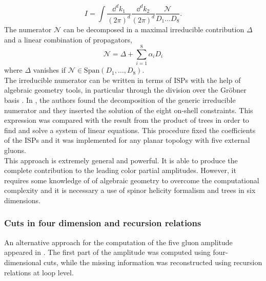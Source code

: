 $$
	I=\int \frac{\dd^d k_1}{(2\pi)^d} \frac{\dd^d k_2}{(2\pi)^d} \frac{\mathcal{N}}{D_1 \dots D_8}.
$$
The numerator $\mathcal{N}$ can be decomposed in a maximal irreducible contribution $\Delta$ and a linear combination of propagators,
$$
	\mathcal{N}=\Delta+\sum_{i=1}^8 \alpha_i D_i
$$
where $\Delta$ vanishes if $\mathcal{N}\in \text{Span}(D_1,\dots,D_8)$.\\
The irreducible numerator can be written in terms of ISPs with the help of algebraic geometry tools, in particular through the division over the Gr\"{o}bner basis \cite{Zhang_2012}. In \cite{2013}, the authors found the decomposition of the generic irreducible numerator and they inserted the solution of the eight on-shell constraints. This expression was compared with the result from the product of trees in order to find and solve a system of linear equations. This procedure fixed the coefficients of the ISPs and it was implemented for any planar topology with five external gluons.\\

This approach is extremely general and powerful. It is able to produce the complete contribution to the leading color partial amplitudes. However, it requires some knowledge of of algebraic geometry to overcome the computational complexity and it is necessary a use of spinor helicity formalism and trees in six dimensions.
\subsubsection{Cuts in four dimension and recursion relations}
An alternative approach for the computation of the five gluon amplitude appeared in \cite{Dunbar_2016}. The first part of the amplitude was computed using four-dimensional cuts, while the missing information was reconstructed using recursion relations at loop level.\\

